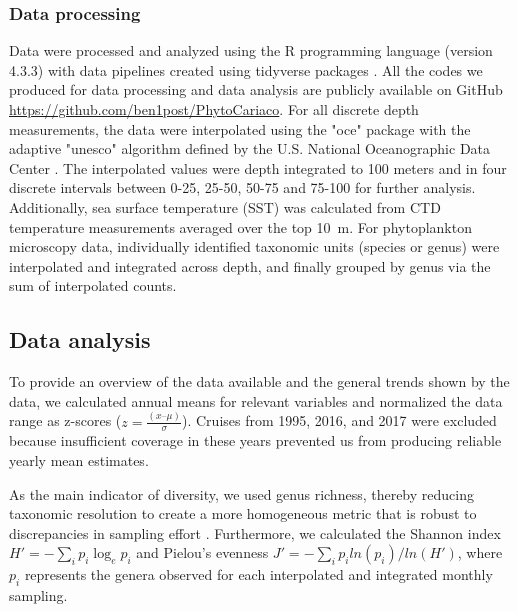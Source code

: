 \documentclass[draft]{agujournal2019}
\begin{document}
    \subsubsection{Data processing}
    Data were processed and analyzed using the R programming language (version 4.3.3) \cite{r_core_team_r_2024} with data pipelines created using tidyverse packages \cite{wickham_welcome_2019}. All the codes we produced for data processing and data analysis are publicly available on GitHub \url{https://github.com/ben1post/PhytoCariaco}.
    For all discrete depth measurements, the data were interpolated using the "oce" package \cite{kelley_oce_2023} with the adaptive "unesco" algorithm defined by the U.S. National Oceanographic Data Center \cite{johnson2006world}. The interpolated values were depth integrated to 100 meters and in four discrete intervals between 0-25, 25-50, 50-75 and 75-100 \meter for further analysis. Additionally, sea surface temperature (SST) was calculated from CTD temperature measurements averaged over the top \qty{10}{\meter}. For phytoplankton microscopy data, individually identified taxonomic units (species or genus) were interpolated and integrated across depth, and finally grouped by genus via the sum of interpolated counts.


\subsection{Data analysis}    
    To provide an overview of the data available and the general trends shown by the data, we calculated annual means for relevant variables and normalized the data range as z-scores ($z = \frac{(x – \mu)}{\sigma}$). Cruises from 1995, 2016, and 2017 were excluded because insufficient coverage in these years prevented us from producing reliable yearly mean estimates. 
    
    As the main indicator of diversity, we used genus richness, thereby reducing taxonomic resolution to create a more homogeneous metric that is robust to discrepancies in sampling effort \cite{ptacnik_diversity_2008, de2020higher}. Furthermore, we calculated the Shannon index $H' = -\sum_i p_i \log_{e} p_i$ and Pielou's evenness $J' = -\sum_i p_i ln( p_i )/ln(H')$, where $p_i$ represents the genera observed for each interpolated and integrated monthly sampling. 

      
\end{document}
